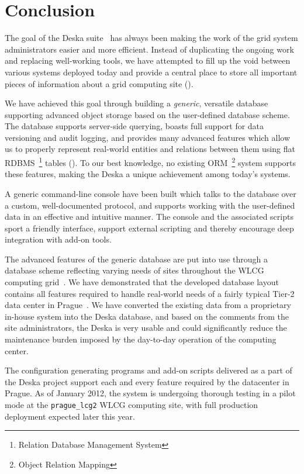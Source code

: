 \documentclass[deska]{subfiles}
\begin{document}
\chapter{Conclusion}
\label{sec:conclusion}

The goal of the Deska suite~\cite{deska-project} has always been making the work of the grid system administrators
easier and more efficient.  Instead of duplicating the ongoing work and replacing well-working tools, we have attempted
to fill up the void between various systems deployed today and provide a central place to store all important pieces of
information about a grid computing site ().

We have achieved this goal through building a {\em generic}, versatile database supporting advanced object storage based
on the user-defined database scheme.  The database supports server-side querying, boasts full support for data
versioning and audit logging, and provides many advanced features which allow us to properly represent real-world
entities and relations between them using flat RDBMS~\footnote{Relation Database Management System} tables
().  To our best knowledge, no existing ORM~\footnote{Object Relation Mapping} system
supports these features, making the Deska a unique achievement among today's systems.

A generic command-line console have been built which talks to the database over a custom, well-documented protocol, and
supports working with the user-defined data in an effective and intuitive manner.  The console and the associated
scripts sport a friendly interface, support external scripting and thereby encourage deep integration with add-on tools.

The advanced features of the generic database are put into use through a database scheme reflecting varying needs of
sites throughout the WLCG computing grid~\cite{wlcg}.  We have demonstrated that the developed database layout contains
all features required to handle real-world needs of a fairly typical Tier-2 data center in Prague~\cite{farm}.  We have
converted the existing data from a proprietary in-house system into the Deska database, and based on the comments from
the site administrators, the Deska is very usable and could significantly reduce the maintenance burden imposed by the
day-to-day operation of the computing center.

The configuration generating programs and add-on scripts delivered as a part of the Deska project support each and every
feature required by the datacenter in Prague.  As of January 2012, the system is undergoing thorough testing in a pilot
mode at the {\tt prague\_lcg2} WLCG computing site, with full production deployment expected later this year.
\end{document}
